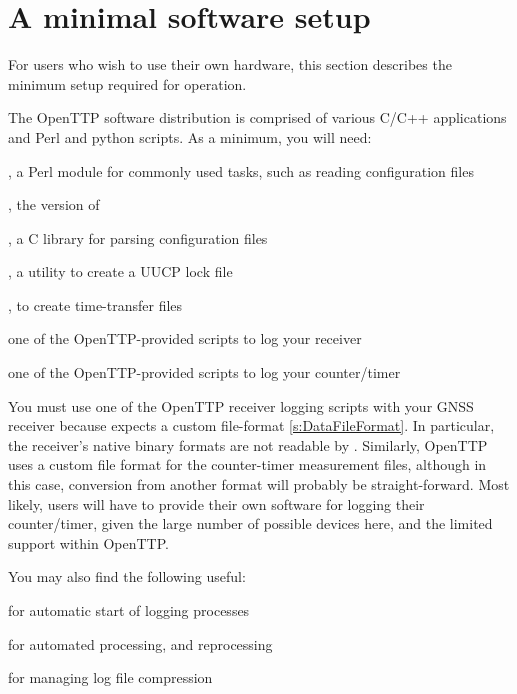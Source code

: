 \section{A minimal software setup}

For users who wish to use their own hardware,
this section describes the minimum setup required for operation.

The OpenTTP software distribution is comprised of various C/C++ applications and Perl and python scripts.
As a minimum, you will need:
\begin{description*}
	\item {}, a Perl module for commonly used tasks, such as reading configuration files
	\item {}, the  version of 
	\item {}, a C library for parsing configuration files
	\item {}, a utility to create a UUCP lock file
	\item {}, to create time-transfer files
	\item one of the OpenTTP-provided scripts to log your receiver
	\item one of the OpenTTP-provided scripts to log your counter/timer
\end{description*}

You must use one of the OpenTTP receiver logging scripts with your GNSS receiver because 
expects a custom file-format \ref{s:DataFileFormat}. In particular, the
receiver's native binary formats are not readable by . Similarly, OpenTTP uses a custom file
format for the counter-timer measurement files, although in this case, conversion from another format
will probably be straight-forward. Most likely, users will have to provide their own software for
logging their counter/timer, given the large number of possible devices here, and the limited
support within OpenTTP.

You may also find the following useful:
\begin{description*}
	\item[]  for automatic start of logging processes
	\item[]  for automated processing, and reprocessing
	\item[]  for managing log file compression
\end{description*}



